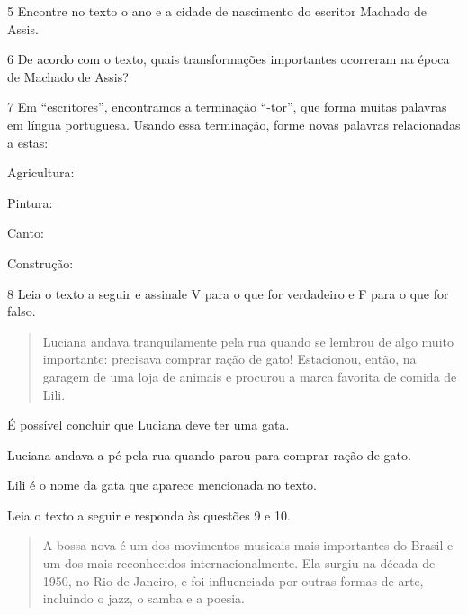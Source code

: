 \num{5} Encontre no texto o ano e a cidade de nascimento do escritor Machado de Assis.


\num{6} De acordo com o texto, quais transformações importantes ocorreram na época de Machado de Assis?


\num{7} Em “escritores”, encontramos a terminação “-tor”, que forma muitas palavras em língua portuguesa. Usando essa terminação, forme novas palavras relacionadas a estas:

\begin{escolha}
\item Agricultura: 

\item Pintura: 

\item Canto: 

\item Construção: 
\end{escolha}

\num{8} Leia o texto a seguir e assinale V para o que for verdadeiro e F para o que for falso.

\begin{quote}
Luciana andava tranquilamente pela rua quando se lembrou de algo muito
importante: precisava comprar ração de gato! Estacionou, então, na
garagem de uma loja de animais e procurou a marca favorita de comida de
Lili.
\end{quote}

\begin{boxlist}
 É possível concluir que Luciana deve ter uma gata.

 Luciana andava a pé pela rua quando parou para comprar ração de gato.

 Lili é o nome da gata que aparece mencionada no texto.
\end{boxlist}


Leia o texto a seguir e responda às questões 9 e 10.

\begin{quote}
A bossa nova é um dos movimentos musicais mais importantes do Brasil e
um dos mais reconhecidos internacionalmente. Ela surgiu na década de
1950, no Rio de Janeiro, e foi influenciada por outras formas de arte,
incluindo o jazz, o samba e a poesia.
\end{quote}

